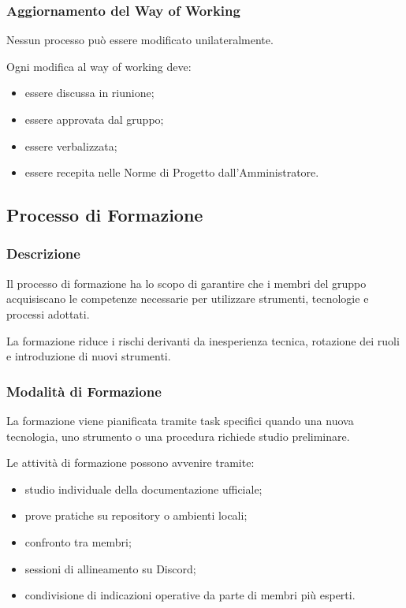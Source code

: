 \subsubsection{Aggiornamento del Way of Working}

Nessun processo può essere modificato unilateralmente.

Ogni modifica al way of working deve:

\begin{itemize}
    \item essere discussa in riunione;
    \item essere approvata dal gruppo;
    \item essere verbalizzata;
    \item essere recepita nelle Norme di Progetto dall'Amministratore.
\end{itemize}


\subsection{Processo di Formazione}
\label{sec:formazione}

\subsubsection{Descrizione}

Il processo di formazione ha lo scopo di garantire che i membri del gruppo
acquisiscano le competenze necessarie per utilizzare strumenti, tecnologie e
processi adottati.

La formazione riduce i rischi derivanti da inesperienza tecnica, rotazione dei
ruoli e introduzione di nuovi strumenti.


\subsubsection{Modalità di Formazione}

La formazione viene pianificata tramite task specifici quando una nuova tecnologia,
uno strumento o una procedura richiede studio preliminare.

Le attività di formazione possono avvenire tramite:

\begin{itemize}
    \item studio individuale della documentazione ufficiale;
    \item prove pratiche su repository o ambienti locali;
    \item confronto tra membri;
    \item sessioni di allineamento su Discord;
    \item condivisione di indicazioni operative da parte di membri più esperti.
\end{itemize}

